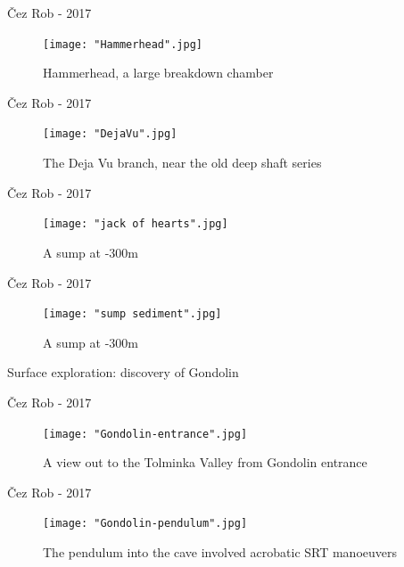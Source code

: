 \documentclass[10pt]{beamer}
\begin{document}
\begin{frame}{Čez Rob - 2017}
    \begin{figure}[!ht]
    \centering
    \texttt{[image: "Hammerhead".jpg]}
    \caption{Hammerhead, a large breakdown chamber}
    \end{figure}
\end{frame} 

\begin{frame}{Čez Rob - 2017}
    \begin{figure}[!ht]
    \centering
    \texttt{[image: "DejaVu".jpg]}
    \caption{The Deja Vu branch, near the old deep shaft series}
    \end{figure}
\end{frame} 



\begin{frame}{Čez Rob - 2017}
    \begin{figure}[!ht]
    \centering
    \texttt{[image: "jack of hearts".jpg]}
    \caption{A sump at -300m}
    \end{figure}
\end{frame} 

\begin{frame}{Čez Rob - 2017}
    \begin{figure}[!ht]
    \centering
    \texttt{[image: "sump sediment".jpg]}
    \caption{A sump at -300m}
    \end{figure}
\end{frame} 

\begin{frame}[standout]
Surface exploration: discovery of Gondolin
\end{frame}

\begin{frame}{Čez Rob - 2017}
    \begin{figure}[!ht]
    \centering
    \texttt{[image: "Gondolin-entrance".jpg]}
    \caption{A view out to the Tolminka Valley from Gondolin entrance}
    \end{figure}
\end{frame} 

\begin{frame}{Čez Rob - 2017}
    \begin{figure}[!ht]
    \centering
    \texttt{[image: "Gondolin-pendulum".jpg]}
    \caption{The pendulum into the cave involved acrobatic SRT manoeuvers}
    \end{figure}
\end{frame} 
\end{document}
